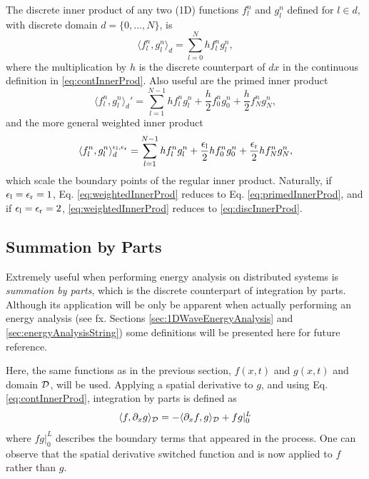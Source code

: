 The discrete inner product of any two (1D) functions $f_l^n$ and $g_l^n$ defined for $l \in d$, with discrete domain $d = \{0,\hdots,N\}$, is
\begin{equation}\label{eq:discInnerProd}
    \langle f_l^n, g_l^n \rangle_d = \sum_{l = 0}^N h f_l^n g_l^n,
\end{equation}
where the multiplication by $h$ is the discrete counterpart of $dx$ in the continuous definition in \eqref{eq:contInnerProd}. 
Also useful are the primed inner product
\begin{equation}\label{eq:primedInnerProd}
    \langle f_l^n, g_l^n \rangle_d' = \sum_{l=1}^{N-1} h f_l^n g_l^n + \frac{h}{2}f_0^ng_0^n + \frac{h}{2}f_N^ng_N^n,
\end{equation}
and the more general weighted inner product
\begin{equation}\label{eq:weightedInnerProd}
    \langle f_l^n, g_l^n \rangle_d^{\epsilon_\text{l}, \epsilon_\text{r}} = \sum_{l=1}^{N-1} h f_l^n g_l^n + \frac{\epsilon_\text{l}}{2}hf_0^ng_0^n + \frac{\epsilon_\text{r}}{2}hf_N^ng_N^n,
\end{equation}
which scale the boundary points of the regular inner product. Naturally, if $\epsilon_\text{l} = \epsilon_\text{r} = 1$, Eq. \eqref{eq:weightedInnerProd} reduces to Eq. \eqref{eq:primedInnerProd}, and if $\epsilon_\text{l} = \epsilon_\text{r} = 2$, \eqref{eq:weightedInnerProd} reduces to \eqref{eq:discInnerProd}.

\subsection{Summation by Parts}\label{sec:summationByParts}
Extremely useful when performing energy analysis on distributed systems is \textit{summation by parts}, which is the discrete counterpart of integration by parts. Although its application will be only be apparent when actually performing an energy analysis (see fx. Sections \ref{sec:1DWaveEnergyAnalysis} and \ref{sec:energyAnalysisString}) some definitions will be presented here for future reference.

Here, the same functions as in the previous section, $f(x,t)$ and $g(x,t)$ and domain $\mathcal{D}$, will be used. Applying a spatial derivative to $g$, and using Eq. \eqref{eq:contInnerProd}, integration by parts is defined as
\begin{equation}\label{eq:integrationByParts}
    \langle f, \partial_x g \rangle_{\mathcal{D}} = -\langle \partial_x f, g\rangle_{\mathcal{D}} + fg|_0^L
\end{equation}
where $fg|_0^L$ describes the boundary terms that appeared in the process. One can observe that the spatial derivative switched function and is now applied to $f$ rather than $g$.

